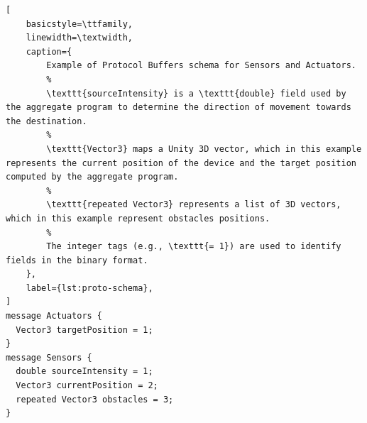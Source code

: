 \documentclass[runningheads]{llncs}
\begin{document}
\begin{lstlisting}[
    basicstyle=\ttfamily,
    linewidth=\textwidth,
    caption={
        Example of Protocol Buffers schema for Sensors and Actuators.
        %
        \texttt{sourceIntensity} is a \texttt{double} field used by the aggregate program to determine the direction of movement towards the destination.
        %
        \texttt{Vector3} maps a Unity 3D vector, which in this example represents the current position of the device and the target position computed by the aggregate program.
        %
        \texttt{repeated Vector3} represents a list of 3D vectors, which in this example represent obstacles positions.
        %
        The integer tags (e.g., \texttt{= 1}) are used to identify fields in the binary format.
    },
    label={lst:proto-schema},
]
message Actuators {
  Vector3 targetPosition = 1;
}
message Sensors {
  double sourceIntensity = 1;
  Vector3 currentPosition = 2;
  repeated Vector3 obstacles = 3;
}
\end{lstlisting}

%
%
%
%
\end{document}
